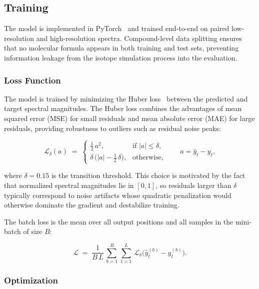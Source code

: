 \documentclass[12pt,a4paper]{report}
\begin{document}
\subsection{Training}
\label{sec:training}

The model is implemented in PyTorch~\cite{paszke2019} and trained end-to-end on paired low-resolution and high-resolution spectra.  Compound-level data splitting ensures that no molecular formula appears in both training and test sets, preventing information leakage from the isotope simulation process into the evaluation.

\subsubsection{Loss Function}

The model is trained by minimizing the Huber loss~\cite{huber1964} between the predicted and target spectral magnitudes.  The Huber loss combines the advantages of mean squared error (MSE) for small residuals and mean absolute error (MAE) for large residuals, providing robustness to outliers such as residual noise peaks:

\begin{equation}
  \mathcal{L}_\delta(a) \;=\;
  \begin{cases}
    \frac{1}{2}\,a^2, & \text{if } |a| \le \delta, \\[4pt]
    \delta\,\bigl(|a| - \tfrac{1}{2}\,\delta\bigr), & \text{otherwise},
  \end{cases}
  \qquad
  a = \hat{y}_t - y_t,
  \label{eq:huber}
\end{equation}

where $\delta = 0.15$ is the transition threshold.  This choice is motivated by the fact that normalized spectral magnitudes lie in $[0,1]$, so residuals larger than $\delta$ typically correspond to noise artifacts whose quadratic penalization would otherwise dominate the gradient and destabilize training.

The batch loss is the mean over all output positions and all samples in the mini-batch of size $B$:

\begin{equation}
  \mathcal{L} \;=\; \frac{1}{B\,L}\,\sum_{b=1}^{B}\,\sum_{t=1}^{L}\,
  \mathcal{L}_\delta\!\bigl(\hat{y}_t^{(b)} - y_t^{(b)}\bigr).
  \label{eq:batch_loss}
\end{equation}

\subsubsection{Optimization}
\end{document}

